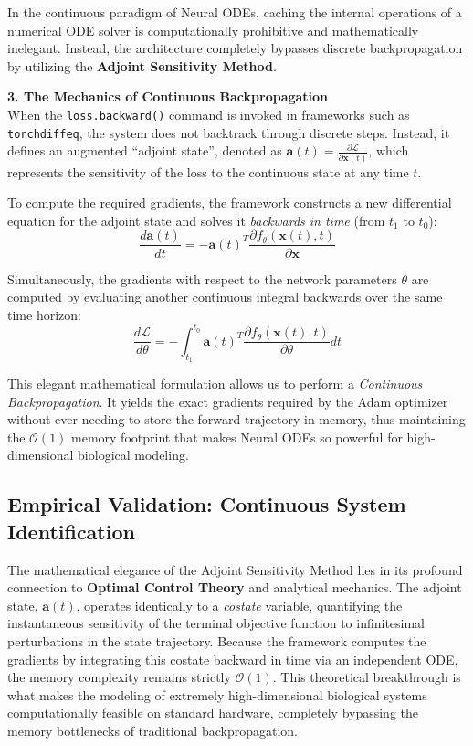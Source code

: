 \documentclass[12pt, a4paper]{article}
\begin{document}
	In the continuous paradigm of Neural ODEs, caching the internal operations of a numerical ODE solver is computationally prohibitive and mathematically inelegant. Instead, the architecture completely bypasses discrete backpropagation by utilizing the \textbf{Adjoint Sensitivity Method}.
	
	\vspace{0.3cm}
	\noindent \textbf{3. The Mechanics of Continuous Backpropagation} \\
	When the \texttt{loss.backward()} command is invoked in frameworks such as \texttt{torchdiffeq}, the system does not backtrack through discrete steps. Instead, it defines an augmented ``adjoint state'', denoted as $\mathbf{a}(t) = \frac{\partial \mathcal{L}}{\partial \mathbf{x}(t)}$, which represents the sensitivity of the loss to the continuous state at any time $t$.
	
	To compute the required gradients, the framework constructs a new differential equation for the adjoint state and solves it \textit{backwards in time} (from $t_1$ to $t_0$):
	$$ \frac{d\mathbf{a}(t)}{dt} = -\mathbf{a}(t)^T \frac{\partial f_\theta(\mathbf{x}(t), t)}{\partial \mathbf{x}} $$
	
	Simultaneously, the gradients with respect to the network parameters $\theta$ are computed by evaluating another continuous integral backwards over the same time horizon:
	$$ \frac{d\mathcal{L}}{d\theta} = -\int_{t_1}^{t_0} \mathbf{a}(t)^T \frac{\partial f_\theta(\mathbf{x}(t), t)}{\partial \theta} dt $$
	
	This elegant mathematical formulation allows us to perform a \textit{Continuous Backpropagation}. It yields the exact gradients required by the Adam optimizer without ever needing to store the forward trajectory in memory, thus maintaining the $\mathcal{O}(1)$ memory footprint that makes Neural ODEs so powerful for high-dimensional biological modeling.
	
	\subsection{Empirical Validation: Continuous System Identification}
	
	The mathematical elegance of the Adjoint Sensitivity Method lies in its profound connection to \textbf{Optimal Control Theory} and analytical mechanics. The adjoint state, $\mathbf{a}(t)$, operates identically to a \textit{costate} variable, quantifying the instantaneous sensitivity of the terminal objective function to infinitesimal perturbations in the state trajectory. Because the framework computes the gradients by integrating this costate backward in time via an independent ODE, the memory complexity remains strictly $\mathcal{O}(1)$. This theoretical breakthrough is what makes the modeling of extremely high-dimensional biological systems computationally feasible on standard hardware, completely bypassing the memory bottlenecks of traditional backpropagation.
	
\end{document}
